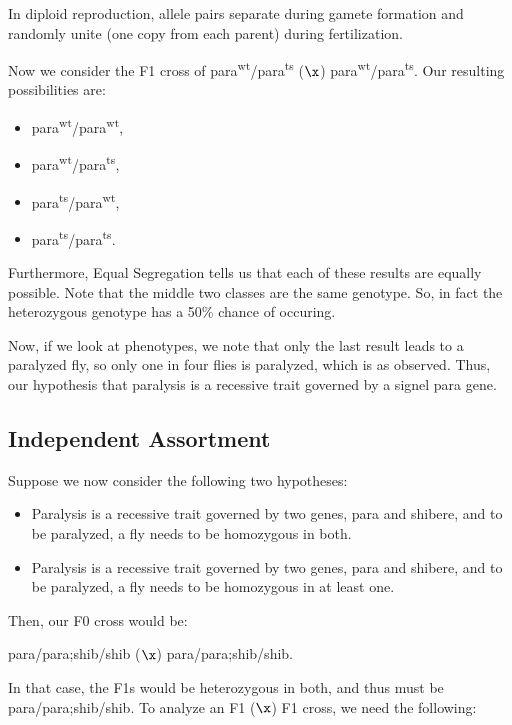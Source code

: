 \begin{law}
	In diploid reproduction, allele pairs separate during gamete formation and randomly unite (one copy from each parent) during fertilization.
\end{law}

Now we consider the F1 cross of para\textsuperscript{wt}/para\textsuperscript{ts} ($\x$) para\textsuperscript{wt}/para\textsuperscript{ts}. Our resulting possibilities are:
\begin{itemize}
	\item para\textsuperscript{wt}/para\textsuperscript{wt},
	\item para\textsuperscript{wt}/para\textsuperscript{ts},
	\item para\textsuperscript{ts}/para\textsuperscript{wt},
	\item para\textsuperscript{ts}/para\textsuperscript{ts}.
\end{itemize}
Furthermore, Equal Segregation tells us that each of these results are equally possible. Note that the middle two classes are the same genotype. So, in fact the heterozygous genotype has a 50\% chance of occuring.

Now, if we look at phenotypes, we note that only the last result leads to a paralyzed fly, so only one in four flies is paralyzed, which is as observed.
Thus, our hypothesis that paralysis is a recessive trait governed by a signel para gene.

\subsection{Independent Assortment}

Suppose we now consider the following two hypotheses:

\begin{itemize}
	\item Paralysis is a recessive trait governed by two genes, para and shibere, and to be paralyzed, a fly needs to be homozygous in both.
	\item Paralysis is a recessive trait governed by two genes, para and shibere, and to be paralyzed, a fly needs to be homozygous in at least one. 
\end{itemize}


Then, our F0 cross would be:
\begin{center}
	para/para;shib/shib ($\x$) para/para;shib/shib.
\end{center}
In that case, the F1s would be heterozygous in both, and thus must be para/para;shib/shib. To analyze an F1 ($\x$) F1 cross, we need the following:

